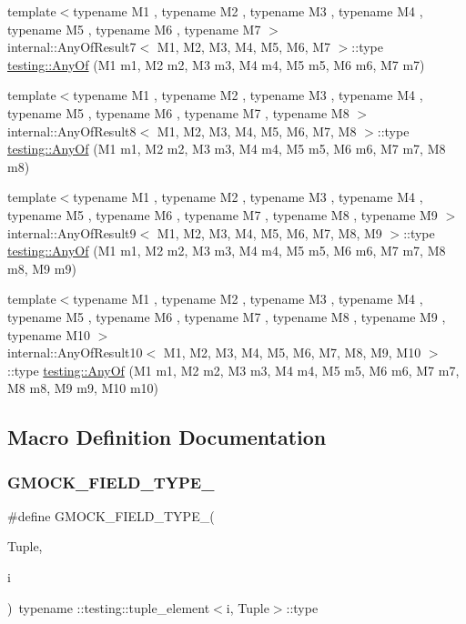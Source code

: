 \begin{DoxyCompactItemize}
\item 
{\footnotesize template$<$typename M1 , typename M2 , typename M3 , typename M4 , typename M5 , typename M6 , typename M7 $>$ }\\internal\+::\+Any\+Of\+Result7$<$ M1, M2, M3, M4, M5, M6, M7 $>$\+::type \mbox{\hyperlink{namespacetesting_a754d1bddb237e79613f6834af3329efa}{testing\+::\+Any\+Of}} (M1 m1, M2 m2, M3 m3, M4 m4, M5 m5, M6 m6, M7 m7)
\item 
{\footnotesize template$<$typename M1 , typename M2 , typename M3 , typename M4 , typename M5 , typename M6 , typename M7 , typename M8 $>$ }\\internal\+::\+Any\+Of\+Result8$<$ M1, M2, M3, M4, M5, M6, M7, M8 $>$\+::type \mbox{\hyperlink{namespacetesting_a9c979c62cc004664b14e0ce444e531d5}{testing\+::\+Any\+Of}} (M1 m1, M2 m2, M3 m3, M4 m4, M5 m5, M6 m6, M7 m7, M8 m8)
\item 
{\footnotesize template$<$typename M1 , typename M2 , typename M3 , typename M4 , typename M5 , typename M6 , typename M7 , typename M8 , typename M9 $>$ }\\internal\+::\+Any\+Of\+Result9$<$ M1, M2, M3, M4, M5, M6, M7, M8, M9 $>$\+::type \mbox{\hyperlink{namespacetesting_a873c812db953aebd4bf2ffbff0e8d770}{testing\+::\+Any\+Of}} (M1 m1, M2 m2, M3 m3, M4 m4, M5 m5, M6 m6, M7 m7, M8 m8, M9 m9)
\item 
{\footnotesize template$<$typename M1 , typename M2 , typename M3 , typename M4 , typename M5 , typename M6 , typename M7 , typename M8 , typename M9 , typename M10 $>$ }\\internal\+::\+Any\+Of\+Result10$<$ M1, M2, M3, M4, M5, M6, M7, M8, M9, M10 $>$\+::type \mbox{\hyperlink{namespacetesting_a1797921d3ed04c7f13dfa8f36bf0bf1c}{testing\+::\+Any\+Of}} (M1 m1, M2 m2, M3 m3, M4 m4, M5 m5, M6 m6, M7 m7, M8 m8, M9 m9, M10 m10)
\end{DoxyCompactItemize}


\subsection{Macro Definition Documentation}
\mbox{\label{gmock-generated-matchers_8h_acf3e27de83a73f0d873da1cd471e505b}} 
\subsubsection{\texorpdfstring{GMOCK\_FIELD\_TYPE\_}{GMOCK\_FIELD\_TYPE\_}}
{\footnotesize\ttfamily \#define G\+M\+O\+C\+K\+\_\+\+F\+I\+E\+L\+D\+\_\+\+T\+Y\+P\+E\+\_\+(\begin{DoxyParamCaption}\item[{}]{Tuple,  }\item[{}]{i }\end{DoxyParamCaption})~typename \+::testing\+::tuple\+\_\+element$<$i, Tuple$>$\+::type}

